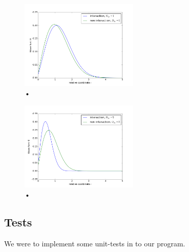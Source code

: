 \documentclass[%
 reprint,
 nobalancelastpage,
 amsmath,amssymb,
 aps,
]{revtex4-1}
\begin{document}
 \begin{figure}[h]
\centering
\includegraphics[width=0.5\textwidth]{../omega1.png}
\caption{•}
\label{fig:my_label}
\end{figure}

 \begin{figure}[h]
\centering
\includegraphics[width=0.5\textwidth]{../omega5.png}
\caption{•}
\label{fig:my_label}
\end{figure}

\subsection{Tests}

We were to implement some unit-tests in to our program.






\end{document}
